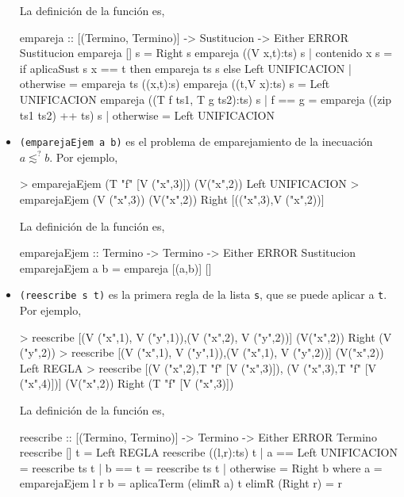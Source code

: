 \begin{itemize}
La definición de la función es,
       
\begin{codigo}
empareja :: [(Termino, Termino)] -> Sustitucion 
            -> Either ERROR Sustitucion
empareja [] s = Right s
empareja ((V x,t):ts) s 
    | contenido x s = if aplicaSust s x == t
                      then empareja ts s
                      else Left UNIFICACION
    | otherwise     = empareja ts ((x,t):s)
empareja ((t,V x):ts) s = Left UNIFICACION
empareja ((T f ts1, T g ts2):ts) s 
    | f == g    = empareja ((zip ts1 ts2) ++ ts) s
    | otherwise = Left UNIFICACION
\end{codigo}   

\item {} \texttt{(emparejaEjem a b)} es el
  problema de emparejamiento de la inecuación $a \lesssim^? b$. Por
  ejemplo,
\begin{sesion}
> emparejaEjem (T "f" [V ("x",3)]) (V("x",2))
Left UNIFICACION
> emparejaEjem (V ("x",3)) (V("x",2))
Right [(("x",3),V ("x",2))]
\end{sesion}
        
La definición de la función es,
       
\begin{codigo}
emparejaEjem :: Termino -> Termino 
                -> Either ERROR Sustitucion
emparejaEjem a b = empareja [(a,b)] []
\end{codigo}   

\item {} \texttt{(reescribe s t)} es la
  primera regla de la lista \texttt{s}, que se puede aplicar a
  \texttt{t}. Por ejemplo,
\begin{sesion}
> reescribe [(V ("x",1), V ("y",1)),(V ("x",2), V ("y",2))] 
  (V("x",2))
Right (V ("y",2))
> reescribe [(V ("x",1), V ("y",1)),(V ("x",1), V ("y",2))] 
  (V("x",2))
Left REGLA
> reescribe [(V ("x",2),T "f" [V ("x",3)]),
  (V ("x",3),T "f" [V ("x",4)])] (V("x",2))
Right (T "f" [V ("x",3)])
\end{sesion}
        
La definición de la función es,
       
\begin{codigo}
reescribe :: [(Termino, Termino)] -> Termino 
             -> Either ERROR Termino
reescribe [] t = Left REGLA
reescribe ((l,r):ts) t
    | a == Left UNIFICACION = reescribe ts t
    | b == t = reescribe ts t
    | otherwise = Right b
    where a = emparejaEjem l r
          b = aplicaTerm (elimR a) t
          elimR (Right r) = r
\end{codigo}   


\end{itemize}
